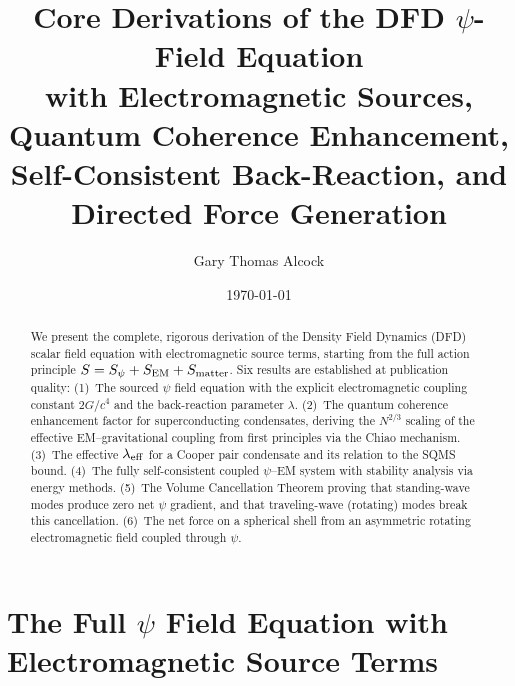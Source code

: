 \documentclass[aps,prd,twocolumn,superscriptaddress,floatfix,nofootinbib]{revtex4-2}
\begin{document}
\title{Core Derivations of the DFD $\psi$-Field Equation\\
with Electromagnetic Sources, Quantum Coherence Enhancement,\\
Self-Consistent Back-Reaction, and Directed Force Generation}

\author{Gary Thomas Alcock}

\date{\today}

\begin{abstract}
We present the complete, rigorous derivation of the Density Field
Dynamics (DFD) scalar field equation with electromagnetic source
terms, starting from the full action principle $S = S_\psi + S_{\rm EM}
+ S_{\rm matter}$. Six results are established at publication quality:
(1)~The sourced $\psi$ field equation with the explicit
electromagnetic coupling constant $2G/c^4$ and the back-reaction
parameter $\lambda$. (2)~The quantum coherence enhancement factor
for superconducting condensates, deriving the $N^{2/3}$ scaling
of the effective EM--gravitational coupling from first principles
via the Chiao mechanism. (3)~The effective $\lambda_{\rm eff}$ for
a Cooper pair condensate and its relation to the SQMS bound.
(4)~The fully self-consistent coupled $\psi$--EM system with
stability analysis via energy methods. (5)~The Volume Cancellation
Theorem proving that standing-wave modes produce zero net $\psi$
gradient, and that traveling-wave (rotating) modes break this
cancellation. (6)~The net force on a spherical shell from an
asymmetric rotating electromagnetic field coupled through $\psi$.
\end{abstract}

\maketitle
\tableofcontents

\section{The Full $\psi$ Field Equation with Electromagnetic
Source Terms}\label{sec:field-equation}
\end{document}
